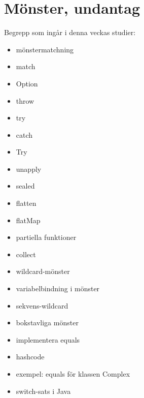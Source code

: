 \chapter{Mönster, undantag}\label{chapter:W06}
Begrepp som ingår i denna veckas studier:
\begin{itemize}[noitemsep,label={$\square$},leftmargin=*]
\item mönstermatchning
\item match
\item Option
\item throw
\item try
\item catch
\item Try
\item unapply
\item sealed
\item flatten
\item flatMap
\item partiella funktioner
\item collect
\item wildcard-mönster
\item variabelbindning i mönster
\item sekvens-wildcard
\item bokstavliga mönster
\item implementera equals
\item hashcode
\item exempel: equals för klassen Complex
\item switch-sats i Java\end{itemize}
